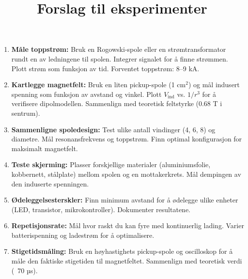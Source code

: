 \documentclass{article}
\title{Forslag til eksperimenter}
\author{}
\date{}
\begin{document}
\maketitle

\begin{enumerate}
\item \textbf{Måle toppstrøm:} Bruk en Rogowski-spole eller en strømtransformator rundt en av ledningene til spolen. Integrer signalet for å finne strømmen. Plott strøm som funksjon av tid. Forventet toppstrøm: 8--9 kA.
\item \textbf{Kartlegge magnetfelt:} Bruk en liten pickup-spole (1 cm$^2$) og mål indusert spenning som funksjon av avstand og vinkel. Plott $V_{\text{ind}}$ vs. $1/r^3$ for å verifisere dipolmodellen. Sammenlign med teoretisk feltstyrke (0.68 T i sentrum).
\item \textbf{Sammenligne spoledesign:} Test ulike antall vindinger (4, 6, 8) og diametre. Mål resonansfrekvens og toppstrøm. Finn optimal konfigurasjon for maksimalt magnetfelt.
\item \textbf{Teste skjerming:} Plasser forskjellige materialer (aluminiumsfolie, kobbernett, stålplate) mellom spolen og en mottakerkrets. Mål dempingen av den induserte spenningen.
\item \textbf{Ødeleggelsesterskler:} Finn minimum avstand for å ødelegge ulike enheter (LED, transistor, mikrokontroller). Dokumenter resultatene.
\item \textbf{Repetisjonsrate:} Mål hvor raskt du kan fyre med kontinuerlig lading. Varier batterispenning og ladestrøm for å optimalisere.
\item \textbf{Stigetidsmåling:} Bruk en høyhastighets pickup-spole og oscilloskop for å måle den faktiske stigetiden til magnetfeltet. Sammenlign med teoretisk verdi (~70 µs).
\end{enumerate}
\end{document}
